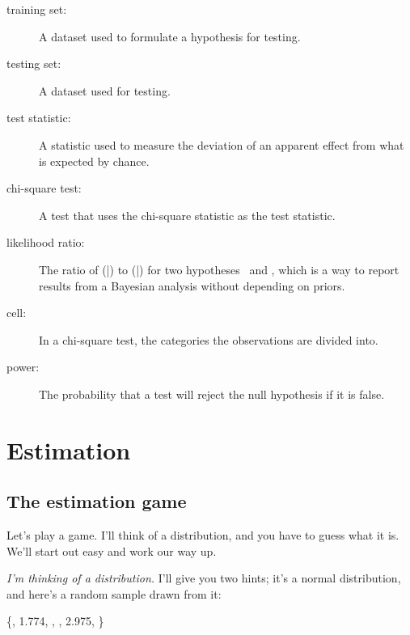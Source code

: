 \documentclass[12pt]{book}
\begin{document}
\begin{description}
\item[training set:] A dataset used to formulate a hypothesis for testing.

\item[testing set:] A dataset used for testing.

\item[test statistic:] A statistic used to measure the deviation of an
apparent effect from what is expected by chance.

\item[chi-square test:] A test that uses the chi-square statistic as
the test statistic.

\item[likelihood ratio:] The ratio of \Prob(\E|\A) to \Prob(\E|\B) 
  for two hypotheses \A~and \B, which is a way to report
  results from a Bayesian analysis without depending on priors.

\item[cell:] In a chi-square test, the categories the observations are
divided into.

\item[power:] The probability that a test will reject the null hypothesis
if it is false.

\end{description}



\chapter{Estimation}
\label{estimation}

\section{The estimation game}

Let's play a game.  I'll think of a distribution, and you have to guess
what it is.  We'll start out easy and work our way up.

{\em I'm thinking of a distribution.}  I'll give you two hints; it's a
normal distribution, and here's a random sample drawn from it:

\{, 1.774, , , 2.975, \}
\end{document}

